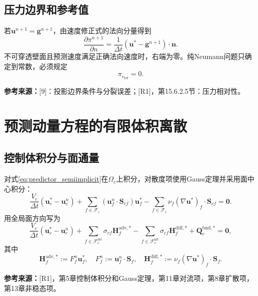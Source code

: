 \documentclass[UTF8,12pt,a4paper]{ctexart}
\numberwithin{equation}{section}
\newcommand{\dt}{\Delta t}
\newcommand{\Guermond}{\textnormal{[9]}}
\newcommand{\Rone}{\textnormal{[R1]}}
\newcommand{\source}[1]{\par\smallskip\noindent\colorbox{sourcebg}{%
  \parbox{0.955\linewidth}{\footnotesize\color{sourcegray}\textbf{参考来源：}#1}}\par\smallskip}
\begin{document}
\subsection{压力边界和参考值}
若$\bm u^{n+1}=\bm g^{n+1}$，由速度修正式的法向分量得到
\begin{equation}
  \boxed{\frac{\partial\pi^{n+1}}{\partial n}
  =\frac{1}{\dt}(\bm u^*-\bm g^{n+1})\cdot\bm n.}
  \label{eq:pressure_neumann}
\end{equation}
不可穿透壁面且预测速度满足正确法向速度时，右端为零。纯Neumann问题只确定到常数，必须规定
\begin{equation}
  \boxed{\pi_{c_{\mathrm{ref}}}=0.}
  \label{eq:pressure_reference}
\end{equation}
\source{\Guermond：投影边界条件与分裂误差；\Rone，第15.6.2.5节：压力相对性。}

\section{预测动量方程的有限体积离散}
\subsection{控制体积分与面通量}
对式\eqref{eq:predictor_semiimplicit}在$\Omega_c$上积分，对散度项使用Gauss定理并采用面中心积分：
\begin{equation}
  \frac{V_c}{\dt}(\bm u_c^*-\bm u_c^n)
  +\sum_{f\in\mathcal F_c}(\bm u_f^n\cdot\bm S_{cf})\bm u_f^*
  -\sum_{f\in\mathcal F_c}\nu_f(\nabla\bm u^*)_f\cdot\bm S_{cf}
  =\bm0.
  \label{eq:predictor_fvm_local}
\end{equation}
用全局面方向写为
\begin{equation}
  \boxed{\frac{V_c}{\dt}(\bm u_c^*-\bm u_c^n)
  +\sum_{f\in\mathcal F_c^{\mathrm{int}}}\sigma_{cf}\bm H_f^{\mathrm{adv},*}
  -\sum_{f\in\mathcal F_c^{\mathrm{int}}}\sigma_{cf}\bm H_f^{\mathrm{diff},*}
  +\bm Q_c^{\mathrm{bnd},*}=\bm0,}
  \label{eq:predictor_fvm_global}
\end{equation}
其中
\begin{equation}
  \bm H_f^{\mathrm{adv},*}:=F_f^n\bm u_f^*,\quad
  F_f^n:=\bm u_f^n\cdot\bm S_f,\quad
  \bm H_f^{\mathrm{diff},*}:=\nu_f(\nabla\bm u^*)_f\cdot\bm S_f.
\end{equation}
\source{\Rone，第5章控制体积分和Gauss定理，第11章对流项，第8章扩散项，第13章非稳态项。}
\end{document}
